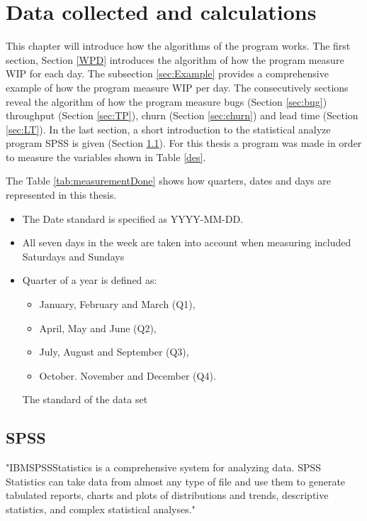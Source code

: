\documentclass[UKenglish]{ifimaster}  %
\begin{document}
\chapter{Data collected and calculations}
\label{ch:DCC}
This chapter will introduce how the algorithms of the program works. The first section, Section \ref{WPD} introduces the algorithm of how the program measure WIP for each day. The subsection \ref{sec:Example} provides a comprehensive example of how the program measure WIP per day. The consecutively sections reveal the algorithm of how the program measure bugs (Section \ref{sec:bug}) throughput (Section \ref{sec:TP}),  churn (Section \ref{sec:churn}) and lead time (Section \ref{sec:LT}). In the last section, a short introduction to the statistical analyze program SPSS is given (Section \ref{sec:SPSS}). For this thesis a program was made in order to measure the variables shown in Table \ref{des}.


The Table \ref{tab:measurementDone} shows how quarters, dates and days are represented in this thesis. 

\begin{table}[!ht]
\centering
\begin{itemize}
\item The Date standard is specified as YYYY-MM-DD.
\item All seven days in the week are taken into account when measuring included Saturdays and Sundays
\item Quarter of a year is defined as: 
\begin{itemize}
\item January, February and March (Q1),
\item April, May and June (Q2),
\item July, August and September (Q3),
\item October. November and December (Q4).
\end{itemize}
\parencite{Quarter}
\caption{The standard of the data set}
\label{tab:measurementDone}
\end{itemize}
\end{table}



\section{SPSS}
\label{sec:SPSS}
"IBM\circledR  SPSS\circledR Statistics is a comprehensive system for analyzing data. SPSS Statistics can take data from almost any type of file and use them to generate tabulated reports, charts and plots of distributions and trends, descriptive statistics, and complex statistical analyses." \parencite{IBM}
\end{document}
